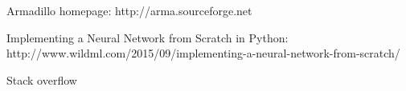 \documentclass[3p,twocolumn]{elsarticle}
\begin{document}
%

 \begin{thebibliography}{00}

%

  Armadillo homepage: http://arma.sourceforge.net
 
  Implementing a Neural Network from Scratch in Python: http://www.wildml.com/2015/09/implementing-a-neural-network-from-scratch/
 
  Stack overflow

 \end{thebibliography}
\end{document}
